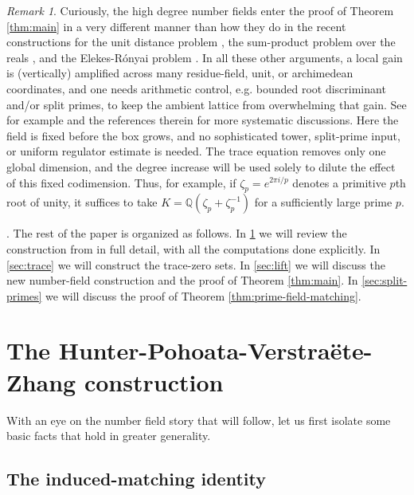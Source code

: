 \documentclass[11pt,reqno]{amsart}
\theoremstyle{definition}
\theoremstyle{remark}
\newtheorem{remark}[remark]{Remark}
\newcommand{\Q}{\mathbb{Q}}
\begin{document}
\begin{remark}
Curiously, the high degree number fields enter the proof of Theorem \ref{thm:main} in a very different manner than how they do in the recent constructions for the unit distance problem \cite{AlonEtAl2026,LeePohoataZhu2026}, the sum-product problem over the reals \cite{BSSZ2026}, and the Elekes-R\'onyai problem \cite{PohoataER2026}. In all these other arguments, a local gain is (vertically) amplified across many residue-field, unit, or archimedean coordinates, and one needs arithmetic control, e.g. bounded root discriminant and/or split primes, to keep the ambient lattice from overwhelming that gain. See for example \cite{PohoataER2026, Bloom, Tao} and the references therein for more systematic discussions. Here the field is fixed before the box grows, and no sophisticated tower, split-prime input, or uniform regulator estimate is needed. The trace equation removes only one global dimension, and the degree increase will be used solely to dilute the effect of this fixed codimension. Thus, for example, if $\zeta_p=e^{2\pi i/p}$ denotes a primitive $p$th root of unity, it suffices to take $K=\Q(\zeta_p+\zeta_p^{-1})$ for a sufficiently large prime $p$.
\end{remark}

\medskip

. The rest of the paper is organized as follows. In \cref{sec:parabola} we will review the construction from \cite{HPVZ2026} in full detail, with all the computations done explicitly. In
\cref{sec:trace} we will construct the trace-zero sets. In
\cref{sec:lift} we will discuss the new number-field construction and the proof of Theorem \ref{thm:main}. In \cref{sec:split-primes} we will discuss the proof of Theorem \ref{thm:prime-field-matching}. 

\section{The Hunter-Pohoata-Verstra\"ete-Zhang construction}
\label{sec:parabola}

With an eye on the number field story that will follow, let us first isolate some basic facts that hold in greater generality. 

\subsection{The induced-matching identity}
\end{document}
